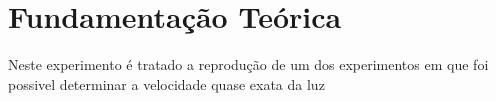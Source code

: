 \section{Fundamentação Teórica}
Neste experimento é tratado a reprodução de um dos experimentos em que foi possivel determinar a velocidade quase exata da luz
